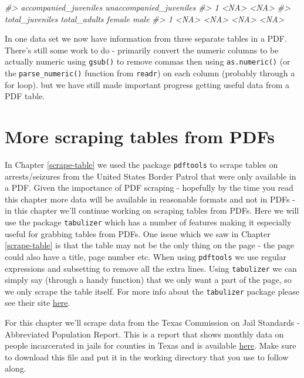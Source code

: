 \documentclass[
  12pt,
  openany]{book}
\newenvironment{Shaded}{\begin{snugshade}}{\end{snugshade}}
\newcommand{\CommentTok}[1]{\textcolor[rgb]{0.37,0.37,0.37}{\textit{#1}}}
\begin{document}
\begin{Shaded}
\begin{Highlighting}[]
\CommentTok{\#\textgreater{}   accompanied\_juveniles unaccompanied\_juveniles}
\CommentTok{\#\textgreater{} 1                  \textless{}NA\textgreater{}                    \textless{}NA\textgreater{}}
\CommentTok{\#\textgreater{}   total\_juveniles total\_adults female male}
\CommentTok{\#\textgreater{} 1            \textless{}NA\textgreater{}         \textless{}NA\textgreater{}   \textless{}NA\textgreater{} \textless{}NA\textgreater{}}
\end{Highlighting}
\end{Shaded}

In one data set we now have information from three separate tables in a PDF. There's still some work to do - primarily convert the numeric columns to be actually numeric using \texttt{gsub()} to remove commas then using \texttt{as.numeric()} (or the \texttt{parse\_numeric()} function from \texttt{readr}) on each column (probably through a for loop). but we have still made important progress getting useful data from a PDF table.

\hypertarget{scrape-table2}{%
\chapter{More scraping tables from PDFs}\label{scrape-table2}}

In Chapter \ref{scrape-table} we used the package \texttt{pdftools} to scrape tables on arrests/seizures from the United States Border Patrol that were only available in a PDF. Given the importance of PDF scraping - hopefully by the time you read this chapter more data will be available in reasonable formats and not in PDFs - in this chapter we'll continue working on scraping tables from PDFs. Here we will use the package \texttt{tabulizer} which has a number of features making it especially useful for grabbing tables from PDFs. One issue which we saw in Chapter \ref{scrape-table} is that the table may not be the only thing on the page - the page could also have a title, page number etc. When using \texttt{pdftools} we use regular expressions and subsetting to remove all the extra lines. Using \texttt{tabulizer} we can simply say (through a handy function) that we only want a part of the page, so we only scrape the table itself. For more info about the \texttt{tabulizer} package please see their site \href{https://docs.ropensci.org/tabulizer/}{here}.

For this chapter we'll scrape data from the Texas Commission on Jail Standards - Abbreviated Population Report. This is a report that shows monthly data on people incarcerated in jails for counties in Texas and is available \href{https://github.com/jacobkap/crimebythenumbers/blob/master/data/AbbreRptCurrent.pdf}{here}. Make sure to download this file and put it in the working directory that you use to follow along.
\end{document}
